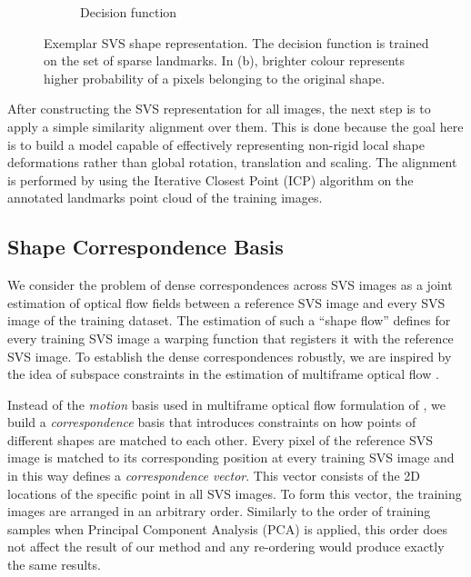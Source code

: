 \begin{figure}[b!]
\begin{subfigure}[b]{0.2\textwidth}
        \caption{Decision function}
        \label{fig:svs}
    \end{subfigure}
    \caption{Exemplar SVS shape representation. The decision function is trained on the set of sparse landmarks. In (b), brighter colour represents higher probability of a pixels belonging to the original shape.}
    \label{fig:build_svs}
\end{figure}


After constructing the SVS representation for all images, the next step is to apply a simple similarity alignment over them. This is done because the goal here is to build a model capable of effectively representing non-rigid local shape deformations rather than global rotation, translation and scaling. The alignment is performed by using the Iterative Closest Point (ICP) algorithm \cite{Besl1992} on the annotated landmarks point cloud of the training images.


\subsection{Shape Correspondence Basis}

We consider the problem of dense correspondences across SVS images as a joint estimation of optical flow fields between a reference SVS image and every SVS image of the training dataset. The estimation of such a ``shape flow'' defines for every training SVS image a warping function that registers it with the reference SVS image. To establish the dense correspondences robustly, we are inspired by the idea of subspace constraints in the estimation of multiframe optical flow \cite{Garg:2013hu}.

Instead of the \emph{motion} basis used in multiframe optical flow formulation of \cite{Garg:2013hu}, we build a \emph{correspondence} basis that introduces constraints on how points of different shapes are matched to each other. Every pixel of the reference SVS image is matched to its corresponding position at every training SVS image and in this way defines a \emph{correspondence vector}. This vector consists of the 2D locations of the specific point in all SVS images. To form this vector, the training images are arranged in an arbitrary order. Similarly to the order of training samples when Principal Component Analysis (PCA) is applied, this order does not affect the result of our method and any re-ordering would produce exactly the same results.


